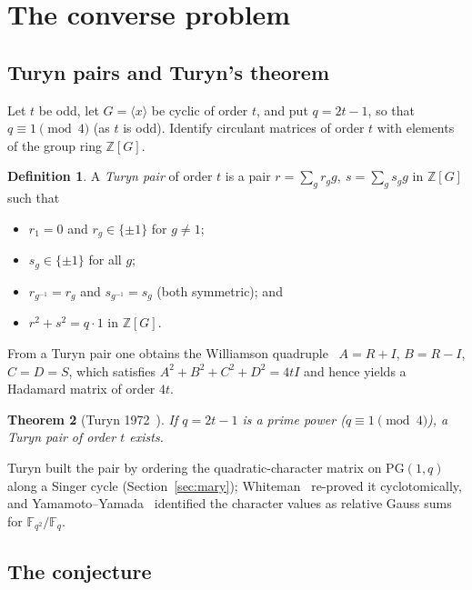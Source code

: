\documentclass[11pt]{article}
\theoremstyle{plain}
\newtheorem{theorem}{Theorem}[section]
\theoremstyle{definition}
\newtheorem{definition}[theorem]{Definition}
\theoremstyle{remark}
\newcommand{\Z}{\mathbb Z}
\newcommand{\F}{\mathbb F}
\newcommand{\PG}{\mathrm{PG}}
\begin{document}
\tableofcontents

\section{The converse problem}\label{sec:intro}

\subsection{Turyn pairs and Turyn's theorem}

Let $t$ be odd, let $G=\langle x\rangle$ be cyclic of order $t$, and put
$q=2t-1$, so that $q\equiv1\pmod4$ (as $t$ is odd). Identify circulant matrices
of order $t$ with elements of the group ring $\Z[G]$.

\begin{definition}\label{def:turyn-pair}
A \emph{Turyn pair} of order $t$ is a pair $r=\sum_g r_g g,\ s=\sum_g s_g g$ in
$\Z[G]$ such that
\begin{itemize}
\item $r_1=0$ and $r_g\in\{\pm1\}$ for $g\ne1$;
\item $s_g\in\{\pm1\}$ for all $g$;
\item $r_{g^{-1}}=r_g$ and $s_{g^{-1}}=s_g$ (both symmetric); and
\item $r^2+s^2=q\cdot1$ in $\Z[G]$.
\end{itemize}
\end{definition}

From a Turyn pair one obtains the Williamson quadruple~\cite{Williamson44}
$A=R+I$, $B=R-I$, $C=D=S$, which satisfies $A^2+B^2+C^2+D^2=4tI$ and hence
yields a Hadamard matrix of order $4t$.

\begin{theorem}[Turyn 1972~\cite{Turyn72}]\label{thm:turyn}
If $q=2t-1$ is a prime power ($q\equiv1\pmod4$), a Turyn pair of order $t$
exists.
\end{theorem}

Turyn built the pair by ordering the quadratic-character matrix on
$\PG(1,q)$ along a Singer cycle (Section~\ref{sec:mary});
Whiteman~\cite{Whiteman73} re-proved it cyclotomically, and
Yamamoto--Yamada~\cite{YY85} identified the character values as relative Gauss
sums for $\F_{q^2}/\F_q$.

\subsection{The conjecture}
\end{document}
